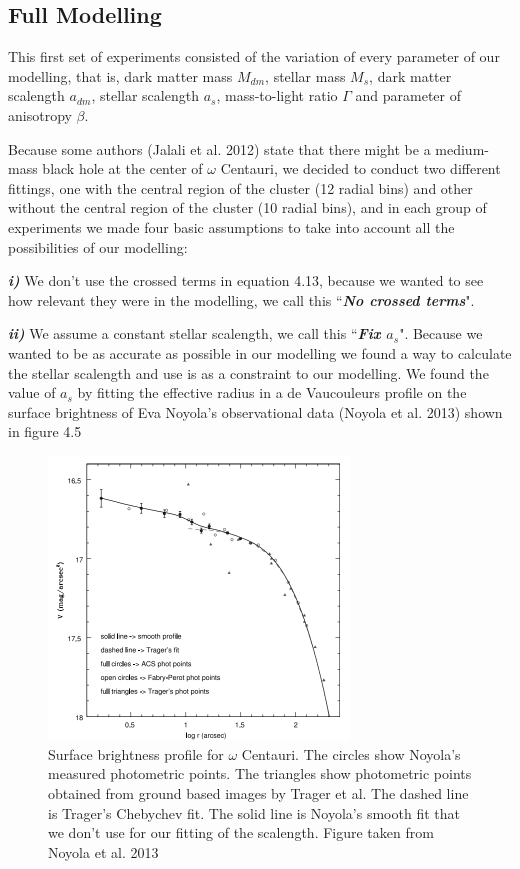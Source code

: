 \subsection{Full Modelling}

This first set of experiments consisted of the variation of every parameter of our modelling, that is, dark matter mass $M_{dm}$, stellar mass $M_{s}$, dark matter scalength $a_{dm}$, stellar scalength $a_{s}$, mass-to-light ratio $\Gamma$ and parameter of anisotropy $\beta$.

Because some authors (Jalali et al. 2012) state that there might be a medium-mass black hole at the center of $\omega$ Centauri, we decided to conduct two different fittings, one with the central region of the cluster (12 radial bins) and other without the central region of the cluster (10 radial bins), and in each group of experiments we made four basic assumptions to take into account all the possibilities of our modelling:

\textbf{\textit{i)}} We don't use the crossed terms in equation 4.13, because we wanted to see how relevant they were in the modelling, we call this ``\textbf{\textit{No crossed terms}}". 

\textbf{\textit{ii)}} We assume a constant stellar scalength, we call this ``\textbf{\textit{Fix $a_{s}$}}". Because we wanted to be as accurate as possible in our modelling we found a way to calculate the stellar scalength and use is as a constraint to our modelling. We found the value of $a_{s}$ by fitting the effective radius in a de Vaucouleurs profile on the surface brightness of Eva Noyola's observational data (Noyola et al. 2013) shown in figure 4.5

\begin{figure}[H]
\centering
\includegraphics[width=8cm]{images/noyola.png}
\caption[Surface brightness profile of Omega Centauri]{Surface brightness profile for $\omega$ Centauri. The circles show
Noyola's measured photometric points. The triangles show photometric points obtained from ground based images by Trager et al. The dashed line is Trager’s Chebychev fit. The solid line is Noyola's smooth fit that we don't use for our fitting of the scalength. Figure taken from Noyola et al. 2013}
\end{figure}

